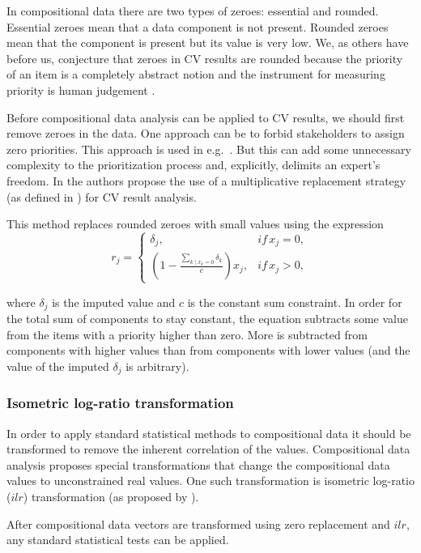 In compositional data there are two types of zeroes: essential and rounded.
Essential zeroes mean that a data component
is not present. Rounded zeroes mean that the component is present but
its value is very low. We, as others have before us, conjecture that zeroes in CV results are 
rounded because the priority of an item is a completely abstract notion
and the instrument for measuring priority is human judgement \cite{Chatzipetrou2010}.

Before compositional data analysis can be applied to CV results, we should first remove
zeroes in the data. One approach can be to forbid stakeholders
to assign zero priorities. This approach is used in e.g.\ \cite{Pettersson2008}.
But this can add some unnecessary complexity to the prioritization
process and, explicitly, delimits an expert's freedom. 
In \cite{Chatzipetrou2010} the authors propose the use of a multiplicative 
replacement strategy (as defined in \cite{Martin-Fernandez2003}) for CV result analysis.

This method replaces rounded zeroes with small values using the expression
\begin{equation}
r_{j}=\begin{cases}
\delta_{j}, & if\, x_{j}=0,\\
(1-\frac{\sum_{k\mid x_{k}=0}\delta_{k}}{c})x_{j}, & if\, x_{j}>0,\end{cases}\label{eq:zero-replace}
\end{equation}

where $\delta_{j}$ is the imputed value and $c$ is the constant sum constraint.
In order for the total sum of components to stay constant, the equation subtracts 
some value from the items with a priority higher than zero.
More is subtracted from components with higher values than from components with lower 
values (and the value of the imputed $\delta_{j}$ is arbitrary).

\subsubsection{\label{Isometric-Logratio-Transformation}Isometric log-ratio transformation}
In order to apply standard statistical methods to compositional data it should be transformed to remove the inherent correlation of the values.
Compositional data analysis proposes special transformations that change the compositional data values to unconstrained real values.
One such transformation is isometric log-ratio ($ilr$) transformation (as proposed by \cite{Pawlowsky-Glahn2006,Filzmoser2007a}).



After compositional data vectors are transformed using zero replacement and $ilr$, any standard statistical tests can be applied.